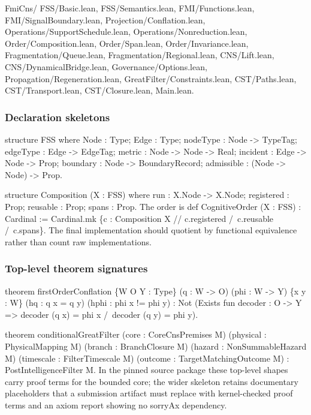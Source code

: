 FmiCns/ FSS/Basic.lean, FSS/Semantics.lean, FMI/Functions.lean,
FMI/SignalBoundary.lean, Projection/Conflation.lean,
Operations/SupportSchedule.lean, Operations/Nonreduction.lean,
Order/Composition.lean, Order/Span.lean, Order/Invariance.lean,
Fragmentation/Queue.lean, Fragmentation/Regional.lean, CNS/Lift.lean,
CNS/DynamicalBridge.lean, Governance/Options.lean,
Propagation/Regeneration.lean, GreatFilter/Constraints.lean,
CST/Paths.lean, CST/Transport.lean, CST/Closure.lean, Main.lean.

\hypertarget{declaration-skeletons}{%
\subsubsection{Declaration skeletons}\label{declaration-skeletons}}

structure FSS where Node : Type; Edge : Type; nodeType : Node
-\textgreater{} TypeTag; edgeType : Edge -\textgreater{} EdgeTag; metric
: Node -\textgreater{} Node -\textgreater{} Real; incident : Edge
-\textgreater{} Node -\textgreater{} Prop; boundary : Node
-\textgreater{} BoundaryRecord; admissible : (Node -\textgreater{} Node)
-\textgreater{} Prop.

structure Composition (X : FSS) where run : X.Node -\textgreater{}
X.Node; registered : Prop; reusable : Prop; spans : Prop. The order is
def CognitiveOrder (X : FSS) : Cardinal := Cardinal.mk \{c : Composition
X // c.registered /~c.reusable /~c.spans\}. The final implementation
should quotient by functional equivalence rather than count raw
implementations.

\hypertarget{top-level-theorem-signatures}{%
\subsubsection{Top-level theorem
signatures}\label{top-level-theorem-signatures}}

theorem firstOrderConflation \{W O Y : Type\} (q : W -\textgreater{} O)
(phi : W -\textgreater{} Y) \{x y : W\} (hq : q x = q y) (hphi : phi x
!= phi y) : Not (Exists fun decoder : O -\textgreater{} Y
=\textgreater{} decoder (q x) = phi x /~decoder (q y) = phi y).

theorem conditionalGreatFilter (core : CoreCnsPremises M) (physical :
PhysicalMapping M) (branch : BranchClosure M) (hazard :
NonSummableHazard M) (timescale : FilterTimescale M) (outcome :
TargetMatchingOutcome M) : PostIntelligenceFilter M. In the pinned
source package these top-level shapes carry proof terms for the bounded
core; the wider skeleton retains documentary placeholders that a
submission artifact must replace with kernel-checked proof terms and an
axiom report showing no sorryAx dependency.

